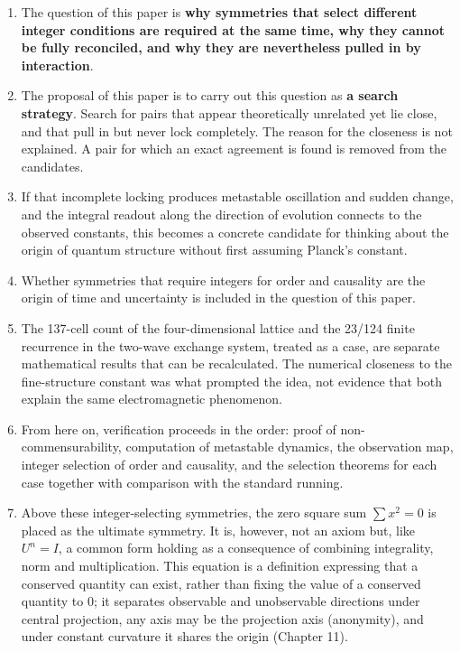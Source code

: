 \documentclass[
  a4paper,
]{article}
\providecommand{\tightlist}{%
  \setlength{\itemsep}{0pt}\setlength{\parskip}{0pt}}
\begin{document}
\begin{enumerate}
\def\labelenumi{\arabic{enumi}.}
\tightlist
\item
  The question of this paper is \textbf{why symmetries that select
  different integer conditions are required at the same time, why they
  cannot be fully reconciled, and why they are nevertheless pulled in by
  interaction}.
\item
  The proposal of this paper is to carry out this question as \textbf{a
  search strategy}. Search for pairs that appear theoretically unrelated
  yet lie close, and that pull in but never lock completely. The reason
  for the closeness is not explained. A pair for which an exact
  agreement is found is removed from the candidates.
\item
  If that incomplete locking produces metastable oscillation and sudden
  change, and the integral readout along the direction of evolution
  connects to the observed constants, this becomes a concrete candidate
  for thinking about the origin of quantum structure without first
  assuming Planck's constant.
\item
  Whether symmetries that require integers for order and causality are
  the origin of time and uncertainty is included in the question of this
  paper.
\item
  The 137-cell count of the four-dimensional lattice and the 23/124
  finite recurrence in the two-wave exchange system, treated as a case,
  are separate mathematical results that can be recalculated. The
  numerical closeness to the fine-structure constant was what prompted
  the idea, not evidence that both explain the same electromagnetic
  phenomenon.
\item
  From here on, verification proceeds in the order: proof of
  non-commensurability, computation of metastable dynamics, the
  observation map, integer selection of order and causality, and the
  selection theorems for each case together with comparison with the
  standard running.
\item
  Above these integer-selecting symmetries, the zero square sum
  \(\sum x^2=0\) is placed as the ultimate symmetry. It is, however, not
  an axiom but, like \(U^n=I\), a common form holding as a consequence
  of combining integrality, norm and multiplication. This equation is a
  definition expressing that a conserved quantity can exist, rather than
  fixing the value of a conserved quantity to 0; it separates observable
  and unobservable directions under central projection, any axis may be
  the projection axis (anonymity), and under constant curvature it
  shares the origin (Chapter 11).
\end{enumerate}
\end{document}
